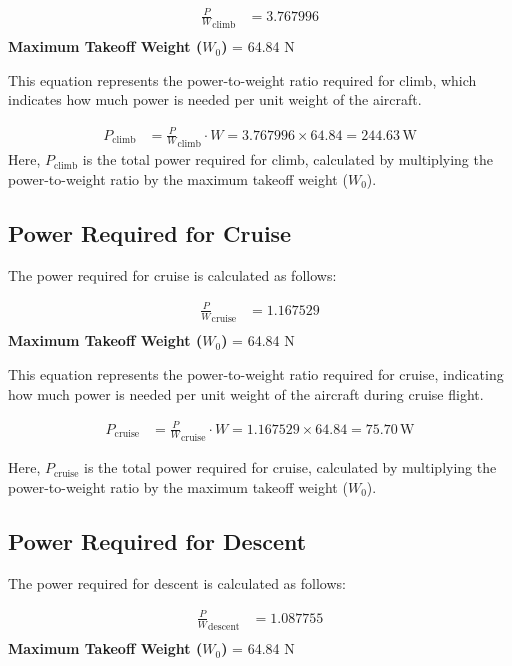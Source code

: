 \documentclass[12 pt]{article}
\begin{document}
\begin{align*}
\frac{P}{W}_{\text{climb}} &= 3.767996 \tag{3.24} \\
\end{align*}
\textbf{Maximum Takeoff Weight ($W_0$)} = 64.84 N

This equation represents the power-to-weight ratio required for climb, which indicates how much power is needed per unit weight of the aircraft.

\begin{align*}
P_{\text{climb}} &= \frac{P}{W}_{\text{climb}} \cdot W = 3.767996 \times 64.84 = 244.63 \, \text{W} \tag{3.25}
\end{align*}
Here, $P_{\text{climb}}$ is the total power required for climb, calculated by multiplying the power-to-weight ratio by the maximum takeoff weight ($W_0$).

\subsection{{Power Required for Cruise}}

The power required for cruise is calculated as follows:

\begin{align*}
\frac{P}{W}_{\text{cruise}} &= 1.167529 \tag{3.26} \\
\end{align*}
\textbf{Maximum Takeoff Weight ($W_0$)} = 64.84 N

This equation represents the power-to-weight ratio required for cruise, indicating how much power is needed per unit weight of the aircraft during cruise flight.

\begin{align*}
P_{\text{cruise}} &= \frac{P}{W}_{\text{cruise}} \cdot W = 1.167529 \times 64.84 = 75.70 \, \text{W} \tag{3.27}
\end{align*}

Here, $P_{\text{cruise}}$ is the total power required for cruise, calculated by multiplying the power-to-weight ratio by the maximum takeoff weight ($W_0$).

\subsection{{Power Required for Descent}}

The power required for descent is calculated as follows:

\begin{align*}
\frac{P}{W}_{\text{descent}} &= 1.087755 \tag{3.28} \\
\end{align*}
\textbf{Maximum Takeoff Weight ($W_0$)} = 64.84 N
\end{document}
